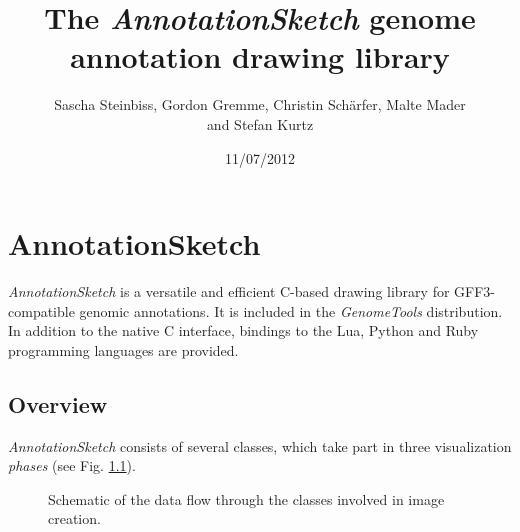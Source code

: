 \documentclass[a4paper]{scrreprt}
\title{The \emph{AnnotationSketch} genome annotation drawing library}
\author{Sascha Steinbiss, Gordon Gremme, Christin Sch\"arfer, Malte Mader\\ and Stefan Kurtz}
\date{11/07/2012}
\begin{document}
\maketitle

\tableofcontents

\chapter{AnnotationSketch}

\emph{AnnotationSketch} is a versatile and efficient C-based drawing library for GFF3-compatible genomic annotations. It is included in the \emph{GenomeTools} distribution. In addition to the native C interface, bindings to the Lua, Python and Ruby programming languages are provided.

\section{Overview}
\emph{AnnotationSketch} consists of several classes, which take part in
three visualization \emph{phases} (see Fig. \ref{dataflow}).

\begin{figure}[ht]
\caption{Schematic of the data flow through the classes involved in image creation.}
\label{dataflow}
\end{figure}
\end{document}
